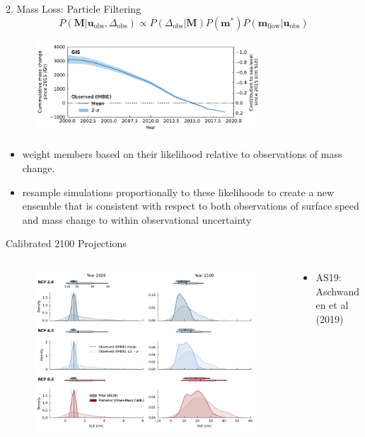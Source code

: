 \documentclass[aspectratio=169,hide notes,intlimits]{beamer}
\begin{document}
\begin{frame}{2. Mass Loss: Particle Filtering}
  \begin{equation*}
    \label{eq:parameter_posterior}
    P(\mathbf{M}|\mathbf{u}_{\mathrm{obs}},\Delta_{\mathrm{obs}}) \propto P(\Delta_{\mathrm{obs}}|\mathbf{M}) P(\mathbf{m}^{*}) P(\mathbf{m}_{\mathrm{flow}}|\mathbf{u}_{\mathrm{obs}})
  \end{equation*}
  \begin{minipage}[t][4cm][t]{\textwidth}
    \begin{figure}
    \includegraphics[height=3.5cm]{GIS_hist_only_obs}
    \end{figure}
  \end{minipage}
  \begin{itemize}
  \item  weight members based on their likelihood relative to observations of mass change.
  \item resample simulations proportionally to these likelihoods to create a new ensemble that is consistent with respect to both  observations of surface speed and mass change to within observational uncertainty
  \end{itemize}
\end{frame}

\begin{frame}{Calibrated 2100 Projections}
        \begin{columns}[c]
    \begin{column}{.8\textwidth}
    \begin{figure}
      \includegraphics[height=7.cm]{sle_pdf_prior_posterior_w_obs_2020_2100}
    \end{figure}
    \end{column}
    \begin{column}{.25\textwidth}
\begin{itemize}\setlength\itemsep{.25em}
    \item AS19: Aschwanden et al (2019)
\end{itemize}
    \end{column}
  \end{columns}
\end{frame}
\end{document}
